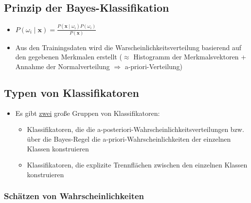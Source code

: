 \documentclass[11pt]{article}
\begin{document}
\subsection{Prinzip der Bayes-Klassifikation}

\begin{itemize}

    \item $P(\omega_i \mid \boldsymbol{x}) = \frac{P(\boldsymbol{x} \mid \omega_i) P(\omega_i)}{P(\boldsymbol{x})}$
    \item Aus den Trainingsdaten wird die Warscheinlichkeitsverteilung basierend auf den gegebenen Merkmalen erstellt ($\approx$ Histogramm der Merkmalsvektoren + Annahme der Normalverteilung $\Rightarrow$ a-priori-Verteilung)
\end{itemize}

\subsection{Typen von Klassifikatoren}

\begin{itemize}
    \item Es gibt \underline{zwei} große Gruppen von Klassifikatoren:
        \begin{itemize}
            \item Klassifikatoren, die die a-posteriori-Wahrscheinlichkeitsverteilungen bzw. über die Bayes-Regel die a-priori-Wahrscheinlichkeiten der einzelnen Klassen konstruieren
            \item Klassifikatoren, die explizite Trennflächen zwischen den einzelnen Klassen konstruieren
        \end{itemize}
\end{itemize}

\subsubsection{Schätzen von Wahrscheinlichkeiten}
\end{document}
